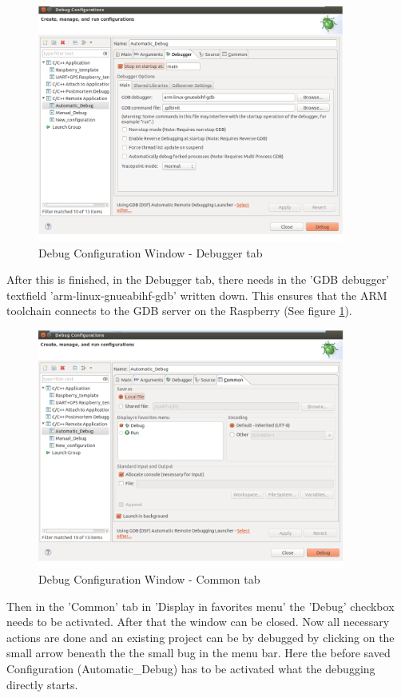 \begin{figure}[H]
	\centering\includegraphics[width=0.9\textwidth]{fig/Debug6}
	\caption{Debug Configuration Window - Debugger tab}
	\label{fig:Debug6}
\end{figure}
After this is finished, in the Debugger tab, there needs in the 'GDB debugger' textfield 'arm-linux-gnueabihf-gdb' written down. This ensures that the ARM toolchain connects to the GDB server on the Raspberry (See figure \ref{fig:Debug6}).

\begin{figure}[H]
	\centering\includegraphics[width=0.9\textwidth]{fig/Debug7}
	\caption{Debug Configuration Window - Common tab}
	\label{fig:Debug7}
\end{figure}

Then in the 'Common' tab in 'Display in favorites menu' the 'Debug' checkbox needs to be activated. After that the window can be closed. Now all necessary actions are done and an existing project can be by debugged by clicking on the small arrow beneath the the small bug in the menu bar. Here the before saved Configuration (Automatic\_Debug) has to be activated what the debugging directly starts.

